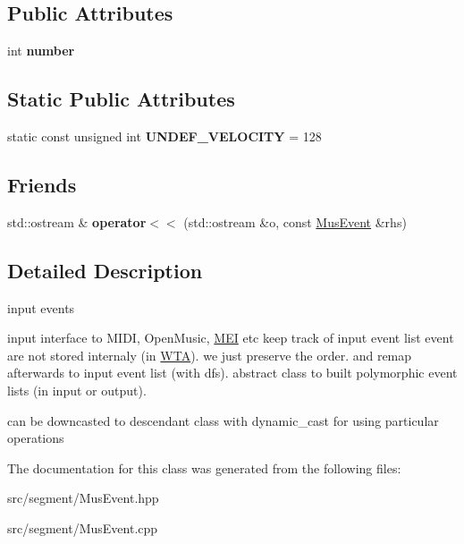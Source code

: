 \subsection*{Public Attributes}
\begin{DoxyCompactItemize}
\item 
\mbox{\label{classMusEvent_a8cbcc375091dd31d300993cb41e5c31f}} 
int {\bfseries number}
\end{DoxyCompactItemize}
\subsection*{Static Public Attributes}
\begin{DoxyCompactItemize}
\item 
static const unsigned int {\bfseries U\+N\+D\+E\+F\+\_\+\+V\+E\+L\+O\+C\+I\+TY} = 128
\end{DoxyCompactItemize}
\subsection*{Friends}
\begin{DoxyCompactItemize}
\item 
\mbox{\label{classMusEvent_ade87c7b11c1a1fdbcd922e08b3eaa3c5}} 
std\+::ostream \& {\bfseries operator$<$$<$} (std\+::ostream \&o, const \mbox{\hyperlink{classMusEvent}{Mus\+Event}} \&rhs)
\end{DoxyCompactItemize}


\subsection{Detailed Description}
input events 

input interface to M\+I\+DI, Open\+Music, \mbox{\hyperlink{classMEI}{M\+EI}} etc keep track of input event list event are not stored internaly (in \mbox{\hyperlink{classWTA}{W\+TA}}). we just preserve the order. and remap afterwards to input event list (with dfs). abstract class to built polymorphic event lists (in input or output).

can be downcasted to descendant class with dynamic\+\_\+cast for using particular operations 

The documentation for this class was generated from the following files\+:\begin{DoxyCompactItemize}
\item 
src/segment/Mus\+Event.\+hpp\item 
src/segment/Mus\+Event.\+cpp\end{DoxyCompactItemize}
